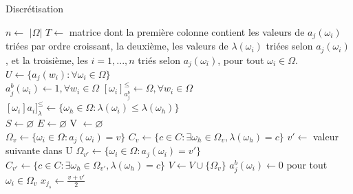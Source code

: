 \documentclass[a4paper]{article}
\begin{document}
\begin{algorithm}[H]
\caption{Discrétisation}
\label{alg:discretize}
\begin{algorithmic}
\State {}
\State {}
\State {}

\State $n\gets$ $| \Omega |$ 
\State $T \gets $ matrice dont la première colonne contient les valeurs de $a_j(\omega_i)$ triées par ordre croissant, la deuxième, les valeurs de $\lambda(\omega_i)$ triées selon $a_j(\omega_i)$, et la troisième, les $i=1,...,n$ triés selon $a_j(\omega_i)$, pour tout $\omega_i \in \Omega$.
\State $U\gets \{a_j(w_i) : \forall \omega_i \in \Omega\}$  \\

\State $a^{b}_j(\omega_i) \gets 1, \forall w_i \in \Omega$ 
\State $[\omega_i]^{\leq}_{a^{b}_j} \gets \Omega, \forall w_i \in \Omega$ 
\State $[\omega_i]a_i]^{\leq}_{\lambda} \gets \{\omega_h \in \Omega : \lambda(\omega_i) \leq \lambda(\omega_h)\}$ \\

\State $S \gets \varnothing $ 
\State $E \gets \varnothing $ 
\State V $\gets \varnothing $  \\

    \State $\Omega_{v} \gets \{\omega_i \in \Omega : a_j(\omega_i) = v\}$
    \State $C_{v} \gets \{c \in C : \exists \omega_h \in \Omega_{v}, \lambda(\omega_h) = c\}$
    \State $v' \gets$ valeur suivante dans U
    \State $\Omega_{v'} \gets \{\omega_i \in \Omega : a_j(\omega_i) = v'\}$
    \State $C_{v'} \gets \{c \in C : \exists \omega_h \in \Omega_{v'}, \lambda(\omega_h) = c\}$
    \State $V \gets V \cup \{\Omega_{v}\}$    
    \State $a^{b}_j(\omega_i) \gets 0$ pour tout $\omega_i \in \Omega_{v}$ 
    \State $x_{j_s}\gets \frac{v + v'}{2}$\\
    

\end{algorithmic}
\end{algorithm}
\end{document}
